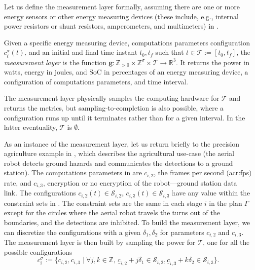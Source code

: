 Let us define the measurement layer formally, assuming there are one or more energy sensors or other energy measuring devices (these include, e.g., internal power resistors or shunt resistors, amperometers, and multimeters) in .

\begin{highlight}
  \begin{defn}\label{def:measur-layer}
    Given a specific energy measuring device, computations parameters configuration $c_i^\sigma(t)$, and an initial and final time instant $t_0,t_f$ such that $t\in\mathcal{T}:=[t_0,t_f]$, the \textit{measurement layer} is the function
    $\mathbf{g}:\mathbb{Z}_{>0}\times\mathbb{Z}^\sigma\times\mathcal{T}\rightarrow\mathbb{R}^3$.
    It returns the power in watts, energy in joules, and SoC in percentages of an energy measuring device, a configuration of computations parameters, and time interval.
  \end{defn}
\end{highlight}

The measurement layer physically samples the computing hardware for $\mathcal{T}$ and returns the metrics, but sampling-to-completion is also possible, where a configuration runs up until it terminates rather than for a given interval. In the latter eventuality, $\mathcal{T}$ is ${\emptyset}$.

As an instance of the measurement layer, let us return briefly to the precision agriculture example in , which describes the agricultural use-case (the aerial robot detects ground hazards and communicates the detections to a ground station). The computations parameters in  are $c_{i,2}$, the frames per second (\Gls{acr:fps}) rate, and $c_{i,3}$, encryption or no encryption of the robot---ground station data link. The configurations $c_{i,2}(t)\in\mathcal{S}_{i,2}$, $c_{i,3}(t)\in\mathcal{S}_{i,3}$ have any value within the constraint sets in . The constraint sets are the same in each stage  $i$ in the plan $\Gamma$ except for the circles where the aerial robot travels the turns out of the boundaries, and the detections are inhibited. To build the measurement layer, we can discretize the configurations with a given $\delta_1,\delta_2$ for parameters $c_{i,2}$ and $c_{i,3}$. The measurement layer is then built by sampling the power for $\mathcal{T}$, one for all the possible configurations
\begin{equation}\label{eq:meas-layer-lin-sampl}
  c_i^\sigma:=\{c_{i,2},c_{i,3}\mid\forall j,k\in\mathbb{Z},\, \underline{c}_{i,2}+j\delta_1\in\mathcal{S}_{i,2},\underline{c}_{i,3}+k\delta_2\in\mathcal{S}_{i,3}\}.
\end{equation}

